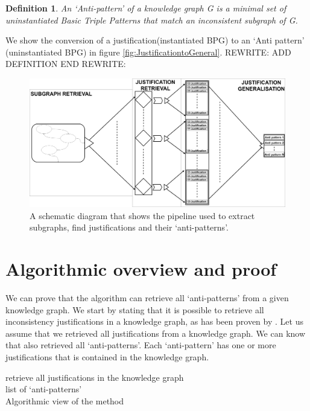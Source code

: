 \documentclass[11pt,letterpaper ,oneside ]{book}
\newtheorem{definition}{Definition}
\begin{document}
	\begin{definition} 
		An \textit{`Anti-pattern'} of a knowledge graph G is a minimal set of uninstantiated Basic Triple Patterns that match an inconsistent subgraph of G.
	\end{definition}
	
	We show the conversion of a justification(instantiated BPG) to an `Anti pattern' (uninstantiated BPG) in figure \ref{fig:JustificationtoGeneral}.
	REWRITE:
	ADD DEFINITION
	END REWRITE:
	
	\begin{figure}
		\includegraphics[width=\linewidth]{images/SimplifiedPipelineMissingPart.png}
		\caption{A schematic diagram that shows the pipeline used to extract subgraphs, find justifications and their `anti-patterns'.}
		\label{fig:simplePipeline}
	\end{figure}
	
	\section{Algorithmic overview and proof}
	We can prove that the algorithm can retrieve all `anti-patterns' from a given knowledge graph. We start by stating that it is possible to retrieve all inconsistency justifications in a knowledge graph, as has been proven by \cite{Horridge:2009}. Let us assume that we retrieved all justifications from a knowledge graph. We can know that also retrieved all `anti-patterns'. Each `anti-pattern' has one or more justifications that is contained in the knowledge graph. \\
	
	\begin{algorithm}
		
		retrieve all justifications in the knowledge graph\\
		\Return list of `anti-patterns'\\
		\caption{Algorithmic view of the method}
	\end{algorithm}
	
\end{document}
